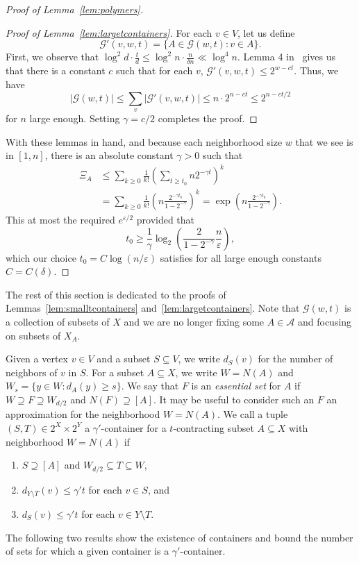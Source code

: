 \documentclass[11pt,letterpaper]{amsart}
\theoremstyle{definition}
\newcommand{\eps}{\varepsilon}
\renewcommand{\subset}{\subseteq}
\begin{document}
\begin{proof}[Proof of Lemma~\ref{lem:polymers}]
\begin{proof}[Proof of Lemma~\ref{lem:largetcontainers}]
For each $v \in V$, let us define
\[
\mathcal{G}'(v,w,t) = \{A \in \mathcal G(w,t) : v \in A\}.
\]
First, we observe that $\log^2d \cdot \frac{t}{d} \leq \log^2 n\cdot \frac{n}{\delta n} \ll \log^4 n$. Lemma 4 in~\cite{JPP22} gives us that there is a constant $c$ such that for each $v$, $\mathcal{G}'(v,w,t) \leq 2^{w - ct}$. Thus, we have
\[
|\mathcal{G}(w,t)| \leq \sum_{v}|\mathcal{G}'(v,w,t)| \leq n\cdot 2^{n - ct} \leq 2^{n - ct/2}
\]
for $n$ large enough. Setting $\gamma = c/2$ completes the proof.
\end{proof}

With these lemmas in hand, and because each neighborhood size $w$ that we see is in $[1,n]$, there is an absolute constant $\gamma>0$ such that 
\begin{align}
 \Xi_A &\le \sum_{k\ge 0}\frac{1}{k!}\left(\sum_{t\ge t_0}n2^{-\gamma t}\right)^k
 \\&=\sum_{k\ge 0}\frac{1}{k!}\left(n\frac{2^{-\gamma t_0}}{1-2^{-\gamma}}\right)^k = \exp\left(n\frac{2^{-\gamma t_0}}{1-2^{-\gamma}}\right).
\end{align}
This at most the required $e^{\eps/2}$ provided that 
\[ t_0 \ge \frac{1}{\gamma}\log_2\left(\frac{2}{1-2^{-\gamma}}\frac{n}{\eps}\right), \]
which our choice $t_0=C\log(n/\eps)$ satisfies for all large enough constants $C=C(\delta)$.
\end{proof}

The rest of this section is dedicated to the proofs of Lemmas~\ref{lem:smalltcontainers} and~\ref{lem:largetcontainers}.
Note that $\mathcal{G}(w,t)$ is a collection of subsets of $X$ and we are no longer fixing some $A\in\mathcal A$ and focusing on subsets of $X_A$. 

Given a vertex $v\in V$ and a subset $S\subset V$, we write $d_S(v)$ for the number of neighbors of $v$ in $S$. 
For a subset $A\subset X$, we write $W=N(A)$ and $W_s=\bigl\{y\in W : d_A(y)\ge s\bigr\}$. 
We say that $F$ is an \emph{essential set} for $A$ if $W \supseteq F \supseteq W_{d/2}$ and $N(F)\supseteq [A]$. 
It may be useful to consider such an $F$ an approximation for the neighborhood $W=N(A)$. 
We call a tuple $(S,T) \in 2^X \times 2^Y$ a $\gamma'$-container for a $t$-contracting subset $A\subset X$ with neighborhood $W=N(A)$ if
\begin{enumerate}
\item\label{itm:containermembership} $S \supseteq [A]$ and $W_{d/2} \subseteq T \subseteq W$,
\item\label{itm:containerSdegrees}  $d_{Y \setminus T}(v)\leq \gamma' t$ for each $v \in S$, and
\item\label{itm:containerYTdegrees}  $d_{S}(v) \leq \gamma' t$ for each $v \in Y \setminus T$.
\end{enumerate}
The following two results show the existence of containers and bound the number of sets for which a given container is a $\gamma'$-container.
\end{document}

